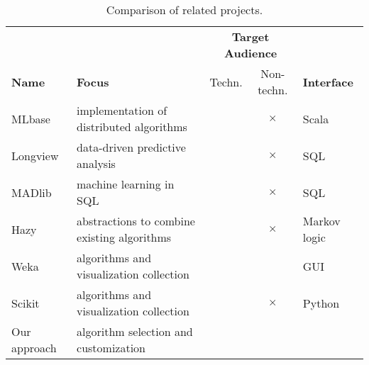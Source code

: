 \begin{table}[t]
\centering
\begin{tabular}{llccl} %
& & \multicolumn{2}{c}{\textbf{Target Audience}} &\\
\textbf{Name} & \textbf{Focus} &						Techn.     & Non-techn. & \textbf{Interface}\\
\hline
MLbase & implementation of distributed algorithms &		\checkmark & $\times$ & Scala\\
Longview & data-driven predictive analysis &			\checkmark & $\times$ & SQL\\
MADlib & machine learning in SQL &						\checkmark & $\times$ & SQL\\
Hazy & abstractions to combine existing algorithms &	\checkmark & $\times$ & Markov logic\\
Weka & algorithms and visualization collection &		\checkmark & \checkmark & GUI\\
Scikit & algorithms and visualization collection &		\checkmark & $\times$ & Python\\
Our approach & algorithm selection and customization &	\checkmark & \checkmark & 
\end{tabular}
\caption[Comparison of related projects]{Comparison of related projects.}\label{tab:related_work}
\end{table}
